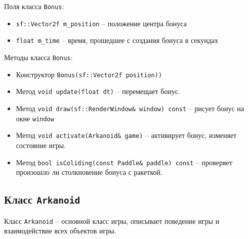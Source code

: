 \documentclass{article}
\begin{document}
Поля класса \texttt{Bonus}:
\begin{itemize}
\item \texttt{sf::Vector2f m\_position} -- положение центра бонуса
\item \texttt{float m\_time} -- время, прошедшее с создания бонуса в секундах
\end{itemize}

Методы класса \texttt{Bonus}:
\begin{itemize}
\item Конструктор \texttt{Bonus(sf::Vector2f position))}
\item Метод \texttt{void update(float dt)} -- перемещает бонус.
\item Метод \texttt{void draw(sf::RenderWindow\& window) const} -- рисует бонус на окне \texttt{window}
\item Метод \texttt{void activate(Arkanoid\& game)} -- активирует бонус, изменяет состояние игры.
\item Метод \texttt{bool isColiding(const Paddle\& paddle) const} -- проверяет произошло ли столкновение бонуса с ракеткой.
\end{itemize}

\newpage
\subsection*{Класс \texttt{Arkanoid}}
Класс \texttt{Arkanoid} -- основной класс игры, описывает поведение игры и взаимодействие всех объектов игры.\\
\end{document}

